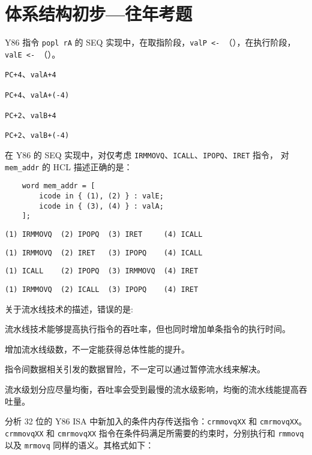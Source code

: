 \chapter{体系结构初步{---}往年考题}
    \begin{problems}
         Y86 指令 \verb|popl rA| 的 SEQ 实现中，在取指阶段，\verb|valP <- |（\quad），在执行阶段，\verb|valE <- |（\quad）。
        \begin{choices}
            \item \verb|PC+4|、\verb|valA+4|
            \item \verb|PC+4|、\verb|valA+(-4)|
            \item \verb|PC+2|、\verb|valB+4|
            \item \verb|PC+2|、\verb|valB+(-4)|
        \end{choices}
         在 Y86 的 SEQ 实现中，对仅考虑 \verb|IRMMOVQ|、\verb|ICALL|、\verb|IPOPQ|、\verb|IRET| 指令， 对 \verb|mem_addr| 的 HCL 描述正确的是：
        \begin{verbatim}
    word mem_addr = [
        icode in { (1), (2) } : valE;
        icode in { (3), (4) } : valA;
    ];
        \end{verbatim}
        \begin{choices}
            \item \verb|(1) IRMMOVQ  (2) IPOPQ  (3) IRET     (4) ICALL|
            \item \verb|(1) IRMMOVQ  (2) IRET   (3) IPOPQ    (4) ICALL|
            \item \verb|(1) ICALL    (2) IPOPQ  (3) IRMMOVQ  (4) IRET|
            \item \verb|(1) IRMMOVQ  (2) ICALL  (3) IPOPQ    (4) IRET|
        \end{choices}
         关于流水线技术的描述，错误的是: 
        \begin{choices}
            \item 流水线技术能够提高执行指令的吞吐率，但也同时增加单条指令的执行时间。
            \item 增加流水线级数，不一定能获得总体性能的提升。
            \item 指令间数据相关引发的数据冒险，不一定可以通过暂停流水线来解决。
            \item 流水级划分应尽量均衡，吞吐率会受到最慢的流水级影响，均衡的流水线能提高吞吐量。
        \end{choices}
         分析 32 位的 Y86 ISA 中新加入的条件内存传送指令：\verb|crmmovqXX| 和 \verb|cmrmovqXX|。\verb|crmmovqXX| 和 \verb|cmrmovqXX| 指令在条件码满足所需要的约束时，分别执行和 \verb|rmmovq| 以及 \verb|mrmovq| 同样的语义。其格式如下：

\end{problems}
